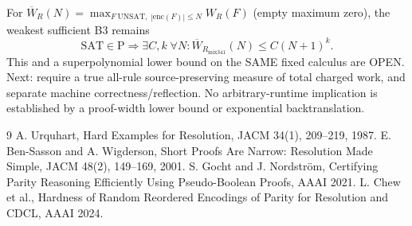\documentclass[11pt]{article}
\begin{document}
For $\overline W_R(N)=\max_{F\mathrm{\ UNSAT},\;|\mathrm{enc}(F)|\le N}W_R(F)$ (empty maximum zero), the weakest sufficient B3 remains
\[\mathrm{SAT}\in\mathrm P\Longrightarrow \exists C,k\;\forall N:\overline W_{R_{\mathrm{mix341}}}(N)\le C(N+1)^k.\]
This and a superpolynomial lower bound on the SAME fixed calculus are OPEN. Next: require a true all-rule source-preserving measure of total charged work, and separate machine correctness/reflection. No arbitrary-runtime implication is established by a proof-width lower bound or exponential backtranslation.
\begin{thebibliography}{9}
 A. Urquhart, Hard Examples for Resolution, JACM 34(1), 209--219, 1987.
 E. Ben-Sasson and A. Wigderson, Short Proofs Are Narrow: Resolution Made Simple, JACM 48(2), 149--169, 2001.
 S. Gocht and J. Nordstr\"om, Certifying Parity Reasoning Efficiently Using Pseudo-Boolean Proofs, AAAI 2021.
 L. Chew et al., Hardness of Random Reordered Encodings of Parity for Resolution and CDCL, AAAI 2024.
\end{thebibliography}
\end{document}
